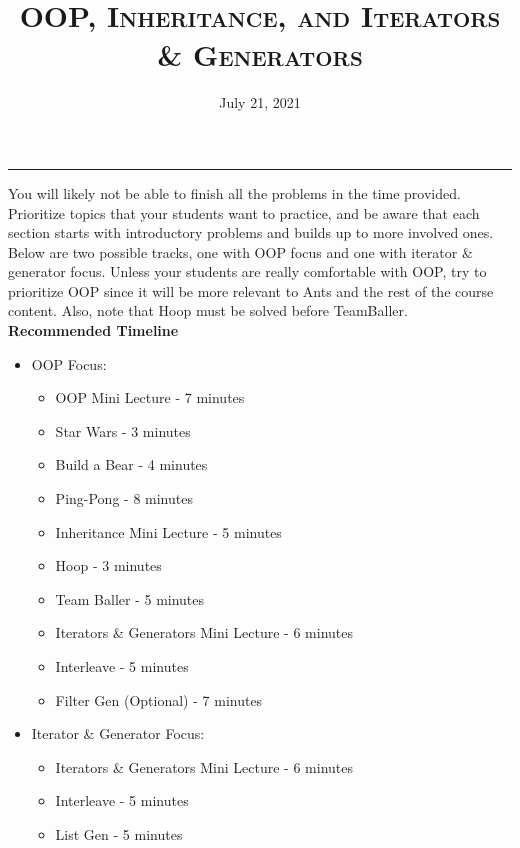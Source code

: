 \documentclass{exam}
\title{\textsc{OOP, Inheritance, and Iterators \& Generators}}
\date{July 21, 2021}
\begin{document}
\maketitle
\rule{\textwidth}{0.15em}
\fontsize{12}{15}\selectfont


\begin{guide}
    You will likely not be able to finish all the problems in the time provided. Prioritize topics that your students want to practice, 
    and be aware that each section starts with introductory problems and builds up to more involved ones. Below are two possible 
    tracks, one with OOP focus and one with iterator \& generator focus. Unless your students are really comfortable with OOP, 
    try to prioritize OOP since it will be more relevant to Ants and the rest of the course content. Also, note that Hoop must be 
    solved before TeamBaller.
    \newline
    \textbf{Recommended Timeline}
    \begin{itemize}
        \item OOP Focus:
        \begin{itemize}
            \item OOP Mini Lecture - 7 minutes
            \item Star Wars - 3 minutes
            \item Build a Bear - 4 minutes
            \item Ping-Pong - 8 minutes
            \item Inheritance Mini Lecture - 5 minutes
            \item Hoop - 3 minutes
            \item Team Baller - 5 minutes
            \item Iterators \& Generators Mini Lecture - 6 minutes
            \item Interleave - 5 minutes
            \item Filter Gen (Optional) - 7 minutes
        \end{itemize}
        \item Iterator \& Generator Focus:
        \begin{itemize}
            \item Iterators \& Generators Mini Lecture - 6 minutes
            \item Interleave - 5 minutes
            \item List Gen - 5 minutes

\end{itemize}
\end{itemize}
\end{guide}
\end{document}
